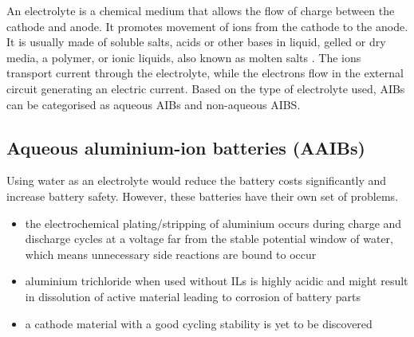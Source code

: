 An electrolyte is a chemical medium that allows the flow of charge between the cathode and anode. It promotes movement of ions from the cathode to the anode. It is usually made of soluble salts, acids or other bases in liquid, gelled or dry media, a polymer, or ionic liquids, also known as molten salts \cite{xu_nonaqueous_2004,armand_ionic-liquid_2009,croce_nanocomposite_1998}. The ions transport current through the electrolyte, while the electrons flow in the external circuit generating an electric current. Based on the type of electrolyte used, AIBs can be categorised as aqueous AIBs and non-aqueous AIBS.  

\subsection{Aqueous aluminium-ion batteries (AAIBs)}
Using water as an electrolyte would reduce the battery costs significantly and increase battery safety. However, these batteries have their own set of problems. 

\begin{itemize}
    \item the electrochemical plating/stripping of aluminium occurs during charge and discharge cycles at a voltage far from the stable potential window of water, which means unnecessary side reactions are bound to occur
    \item aluminium trichloride  when used without ILs is highly acidic and might result in dissolution of active material leading to corrosion of battery parts
    \item a cathode material with a good cycling stability is yet to be discovered
\end{itemize}  

